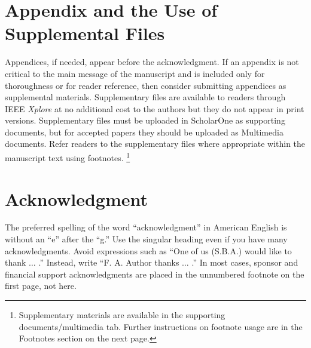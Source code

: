 \documentclass[journal,twoside,web]{ieeecolor}
\begin{document}
\section*{Appendix and the Use of Supplemental Files}
Appendices, if needed, appear before the acknowledgment. If an appendix is not
critical to the main message of the manuscript and is included only for thoroughness
or for reader reference, then consider submitting appendices as supplemental materials.
Supplementary files are available to readers through IEEE \emph{Xplore\textregistered}
at no additional cost to the authors but they do not appear in print versions.
Supplementary files must be uploaded in ScholarOne as supporting documents, but for
accepted papers they should be uploaded as Multimedia documents. Refer readers
to the supplementary files where appropriate within the manuscript text using footnotes.
\footnote{Supplementary materials are available in the supporting documents/multimedia tab.
Further instructions on footnote usage are in the Footnotes section on the next page.}

\section*{Acknowledgment}
The preferred spelling of the word ``acknowledgment'' in American English is 
without an ``e'' after the ``g.'' Use the singular heading even if you have 
many acknowledgments. Avoid expressions such as ``One of us (S.B.A.) would 
like to thank $\ldots$ .'' Instead, write ``F. A. Author thanks $\ldots$ .'' In most 
cases, sponsor and financial support acknowledgments are placed in the 
unnumbered footnote on the first page, not here.
\end{document}

